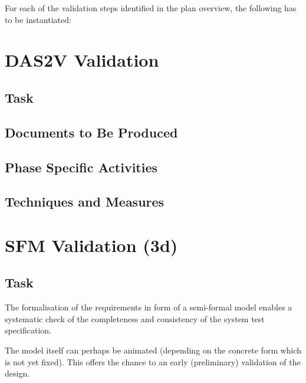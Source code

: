 

For each of the validation steps identified in the plan
  overview, the following has to be instantiated:

\section{DAS2V Validation}
\label{sec:dasv-validation}

\subsection{Task}
\label{sec:dasv-valid-task}


\subsection{Documents to Be Produced}
\label{sec:dasv-valid-docum-be-prod}


\subsection{Phase Specific Activities}
\label{sec:dasv-valid-phase-spec-activ}

\subsection{Techniques and Measures}
\label{sec:dasv-valid-techniques-measures}



\section{SFM Validation (3d)}
\label{sec:sfm-validation}

\subsection{Task}
\label{sec:sfm-valid-task}

The formalisation of the requirements in form of a semi-formal model
enables a systematic check of the completeness and consistency of the
system test specification.

The model itself can perhaps be animated (depending on the concrete
form which is not yet fixed). This offers the chance to an early
(preliminary) validation of the design.

